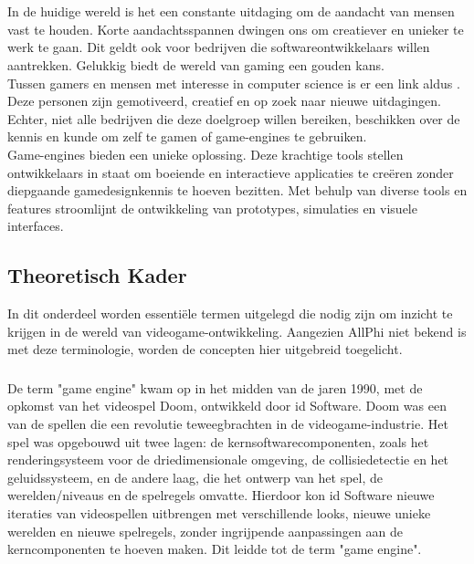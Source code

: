 \chapter{}%
\label{ch:stand-van-zaken}

In de huidige wereld is het een constante uitdaging om de aandacht van mensen vast te houden. Korte aandachtsspannen dwingen ons om creatiever en unieker te werk te gaan. Dit geldt ook voor bedrijven die softwareontwikkelaars willen aantrekken. Gelukkig biedt de wereld van gaming een gouden kans.
\\
Tussen gamers en mensen met interesse in computer science is er een link aldus \cite{sevin2016playing}. Deze personen zijn gemotiveerd, creatief en op zoek naar nieuwe uitdagingen. Echter, niet alle bedrijven die deze doelgroep willen bereiken, beschikken over de kennis en kunde om zelf te gamen of game-engines te gebruiken.
\\
Game-engines bieden een unieke oplossing. Deze krachtige tools stellen ontwikkelaars in staat om boeiende en interactieve applicaties te creëren zonder diepgaande gamedesignkennis te hoeven bezitten. Met behulp van diverse tools en features stroomlijnt de ontwikkeling van prototypes, simulaties en visuele interfaces.

\section{Theoretisch Kader}
In dit onderdeel worden essentiële termen uitgelegd die nodig zijn om inzicht te krijgen in de wereld van videogame-ontwikkeling. Aangezien AllPhi niet bekend is met deze terminologie, worden de concepten hier uitgebreid toegelicht.
\subsection{}%
\label{sec:game-engines}
De term "game engine" kwam op in het midden van de jaren 1990, met de opkomst van het videospel Doom, ontwikkeld door id Software. Doom was een van de spellen die een revolutie teweegbrachten in de videogame-industrie. Het spel was opgebouwd uit twee lagen: de kernsoftwarecomponenten, zoals het renderingsysteem voor de driedimensionale omgeving, de collisiedetectie en het geluidssysteem, en de andere laag, die het ontwerp van het spel, de werelden/niveaus en de spelregels omvatte. Hierdoor kon id Software nieuwe iteraties van videospellen uitbrengen met verschillende looks, nieuwe unieke werelden en nieuwe spelregels, zonder ingrijpende aanpassingen aan de kerncomponenten te hoeven maken. Dit leidde tot de term "game engine". \cite{gregory2018game}

